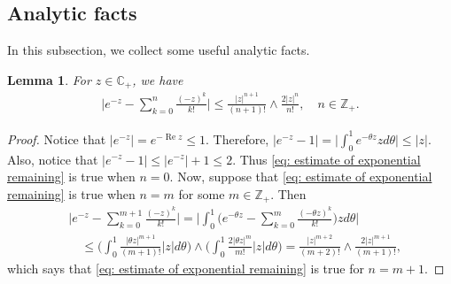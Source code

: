 \documentclass[12pt,a4paper]{amsart}
\theoremstyle{plain}
\newtheorem{lem}[thm]{Lemma}
\theoremstyle{definition}
\numberwithin{equation}{section}
\begin{document}
\appendix
\section{ }
\subsection{Analytic facts}
In this subsection, we collect some useful analytic facts.
\begin{lem}
  \label{lem: estimate of exponential remaining}
  For $z\in \mathbb C_+$,  we have
  \begin{align}
    \label{eq: estimate of exponential remaining}
    \Big|e^{-z} - \sum_{k=0}^n \frac{(-z)^k}{k!} \Big|
    \leq \frac{|z|^{n+1}}{(n+1)!} \wedge \frac{2|z|^{n}}{n!}, \quad n\in \mathbb Z_+.
  \end{align}
\end{lem}
\begin{proof}
  Notice that $|e^{-z}| = e^{- \operatorname{Re} z} \leq 1$.
  Therefore, $ |e^{-z} - 1| = \Big| \int_0^1 e^{-\theta z} z d\theta\Big| \leq |z|. $
  Also, notice that $|e^{-z} - 1| \leq |e^{-z}|+1 \leq 2$.
  Thus \eqref{eq: estimate of exponential remaining} is true when $n = 0$.
  Now, suppose that \eqref{eq: estimate of exponential remaining} is true when $n = m$ for some $m \in \mathbb Z_+$.
  Then
  \begin{align}
    &\Big|e^{-z} - \sum_{k=0}^{m+1} \frac{(-z)^k}{k!}\Big|
      = \Big| \int_0^1\Big(e^{-\theta z} - \sum_{k=0}^m \frac{(-\theta z)^k}{k!} \Big) z d\theta \Big| \\
    & \quad \leq  \Big(\int_0^1 \frac{|\theta z|^{m+1}}{(m+1)!} |z| d\theta\Big) \wedge \Big(\int_0^1 \frac{2|\theta z|^{m}}{m!} |z| d\theta\Big)
      = \frac{|z|^{m+2}}{(m+2)!} \wedge \frac{2|z|^{m+1}}{(m+1)!},
  \end{align}
  which says that \eqref{eq: estimate of exponential remaining} is true for $n = m + 1$.
\end{proof}
\end{document}
